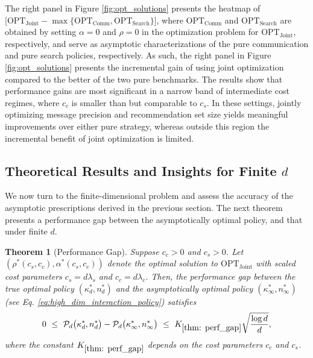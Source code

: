 \documentclass[12pt]{article}
\newtheorem{theorem}{Theorem}
\theoremstyle{definition}
\theoremstyle{remark}
\begin{document}
The right panel in Figure \ref{fig:opt_solutions} presents the heatmap of $\big[\text{OPT}_{\text{Joint}} - \max \{\text{OPT}_{\text{Comm}}, \text{OPT}_{\text{Search}}\}\big]$, where $\text{OPT}_{\text{Comm}}$ and $\text{OPT}_{\text{Search}}$ are obtained by setting $\alpha = 0$ and $\rho = 0$ in the optimization problem for $\text{OPT}_{\text{Joint}}$, respectively, and serve as asymptotic characterizations of the pure communication and pure search policies, respectively. As such, the right panel in Figure \ref{fig:opt_solutions} presents the incremental gain of using joint optimization compared to the better of the two pure benchmarks. The results show that performance gains are most significant in a narrow band of intermediate cost regimes, where $c_c$ is smaller than but comparable to $c_s$. In these settings, jointly optimizing message precision and recommendation set size yields meaningful improvements over either pure strategy, whereas outside this region the incremental benefit of joint optimization is limited.

\subsection{Theoretical Results and Insights for Finite \texorpdfstring{$d$}{d}}
\label{sec:results_finite_d}
We now turn to the finite-dimensional problem and assess the accuracy of the asymptotic prescriptions derived in the previous section. The next theorem presents a performance gap between the asymptotically optimal policy, and that under finite $d$.

\begin{theorem}[Performance Gap]
\label{thm: perf_gap}
Suppose $c_c >0$ and $c_s>0$. Let $(\rho^*(c_s,c_c), \alpha^*(c_s,c_c))$ denote the optimal solution to $\mathrm{OPT}_{\mathrm{Joint}}$ with scaled cost parameters $c_s = d\lambda_s$ and $c_c = d\lambda_c$. Then, the performance gap between the true optimal policy $(\kappa^*_d, n^*_d)$ and the asymptotically optimal policy $(\kappa^*_\infty, n^*_\infty)$ (see Eq. \eqref{eq:high_dim_interaction_policy}) satisfies
\begin{align}
    0 \ \leq \ \mathcal{P}_d \big(\kappa^*_d, n^*_d\big) - \mathcal{P}_d\big(\kappa^*_\infty, n^*_\infty\big) \ \leq \ K_{\ref{thm: perf_gap}} \sqrt{\frac{\log d}{d}},
\end{align}
where the constant $K_{\ref{thm: perf_gap}}$ depends on the cost parameters $c_c$ and $c_s$.
\end{theorem}
\end{document}
